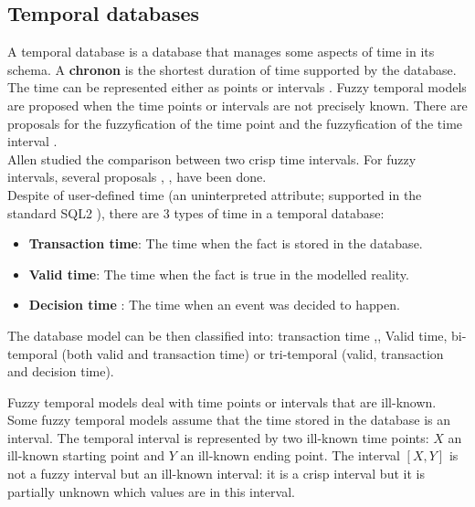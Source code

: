 \documentclass[twoside,twocolumn,a4paper]{article}
\begin{document}
\subsection{\label{subsec:temporal}Temporal databases}
A temporal database \cite{Dyreson1994} is a database that manages some aspects of time in its schema. A \textbf{chronon} is the shortest duration of time supported by the database. The time can be represented either as points or intervals \cite{655777}. Fuzzy temporal models \cite{4481150} are proposed when the time points or intervals are not precisely known. There are proposals for the  fuzzyfication of the time point \cite{Dubois89} and the fuzzyfication of the time interval \cite{Garrido2009}.\\
Allen \cite{Allen:1983:MKT:182.358434} studied the comparison between two crisp time intervals. For fuzzy intervals, several proposals \cite{4481150}, \cite{springerlink:10.1007/978-3-540-39964-3_57},\cite{10.1109/TIME.2004.1314418} have been done.\\
Despite of user-defined time (an uninterpreted attribute; supported in the standard SQL2 \cite{Mel93}), there are 3 types of time in a temporal database:
\begin{itemize}
	\item  
	\textbf{Transaction time}: The time when the fact is stored in the database.
	\item 
	\textbf{Valid time}: The time when the fact is true in the modelled reality.
	\item 
	\textbf{Decision time} \cite{Nascimento95decisiontime}: The time when an event was decided to happen. 
\end{itemize}	
The  database model can be then classified into: transaction time \cite{Ston87},\cite{Jensen:1991:IIM:627283.627484}, Valid time, bi-temporal \cite{Snodgrass:1984:TQL:588011.588041}(both valid and transaction time) or tri-temporal \cite{Nascimento95decisiontime} (valid, transaction and decision time).

Fuzzy temporal models \cite{4481150} deal with time points \cite{Dubois89} or intervals \cite{Garrido2009} that are ill-known. Some fuzzy temporal models assume that the time stored in the database is an interval. The temporal interval is represented by two ill-known time points: $X$  an ill-known starting point and $Y$ an ill-known ending point. The interval $\left[X,Y\right]$ is not a fuzzy interval but an ill-known interval: it is a crisp interval but it is partially unknown which values are in this interval.
\end{document}
